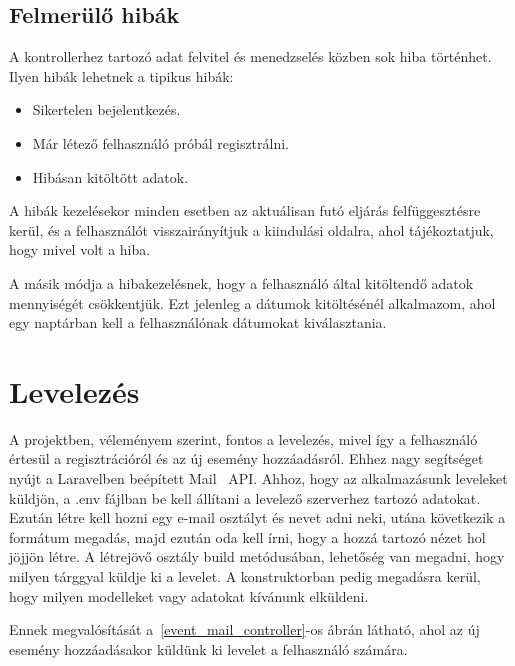 \documentclass[
]{thesis-ekf}
\theoremstyle{definition}
\theoremstyle{remark}
\begin{document}
	\subsection{Felmerülő hibák}
	A kontrollerhez tartozó adat felvitel és menedzselés közben sok hiba történhet. Ilyen hibák lehetnek a tipikus hibák:
	\begin{itemize}
		\item Sikertelen bejelentkezés. 
		\item Már létező felhasználó próbál regisztrálni.
		\item Hibásan kitöltött adatok.
	\end{itemize}
	A hibák kezelésekor minden esetben az aktuálisan futó eljárás felfüggesztésre kerül, és a felhasználót visszairányítjuk a kiindulási oldalra, ahol tájékoztatjuk, hogy mivel volt a hiba. 
	
	A másik módja a hibakezelésnek, hogy a felhasználó által kitöltendő adatok mennyiségét csökkentjük. Ezt jelenleg a dátumok kitöltésénél alkalmazom, ahol egy naptárban kell a felhasználónak dátumokat kiválasztania. 
	
	\section{Levelezés}
	A projektben, véleményem szerint, fontos a levelezés, mivel így a felhasználó értesül a regisztrációról és az új esemény hozzáadásról. Ehhez nagy segítséget nyújt a Laravelben beépített Mail~\cite{laravel_mail} API. Ahhoz, hogy az alkalmazásunk leveleket küldjön, a .env fájlban be kell állítani a levelező szerverhez tartozó adatokat. Ezután létre kell hozni egy e-mail osztályt és nevet adni neki, utána következik a formátum megadás, majd ezután oda kell írni, hogy a hozzá tartozó nézet hol jöjjön létre. A létrejövő osztály build metódusában, lehetőség van megadni, hogy milyen tárggyal küldje ki a levelet. A konstruktorban pedig megadásra kerül, hogy milyen modelleket vagy adatokat kívánunk elküldeni.
	
	Ennek megvalósítását a~\ref{event_mail_controller}-os ábrán látható, ahol az új esemény hozzáadásakor küldünk ki levelet a felhasználó számára.
	
	
	
\end{document}
